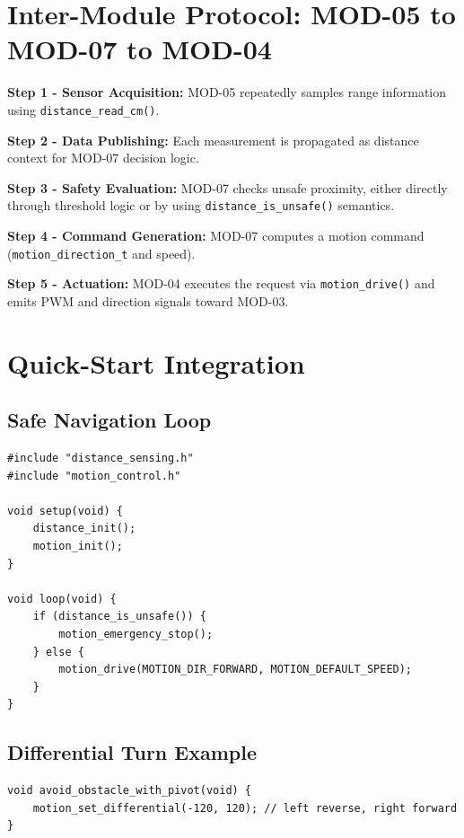 \documentclass[a4paper,11pt]{article}
\begin{document}
\section{Inter-Module Protocol: MOD-05 to MOD-07 to MOD-04}

\textbf{Step 1 - Sensor Acquisition:}
MOD-05 repeatedly samples range information using \texttt{distance\_read\_cm()}.

\textbf{Step 2 - Data Publishing:}
Each measurement is propagated as distance context for MOD-07 decision logic.

\textbf{Step 3 - Safety Evaluation:}
MOD-07 checks unsafe proximity, either directly through threshold logic or by
using \texttt{distance\_is\_unsafe()} semantics.

\textbf{Step 4 - Command Generation:}
MOD-07 computes a motion command (\texttt{motion\_direction\_t} and speed).

\textbf{Step 5 - Actuation:}
MOD-04 executes the request via \texttt{motion\_drive()} and emits PWM and
direction signals toward MOD-03.

\section{Quick-Start Integration}

\subsection{Safe Navigation Loop}

\begin{lstlisting}
#include "distance_sensing.h"
#include "motion_control.h"

void setup(void) {
    distance_init();
    motion_init();
}

void loop(void) {
    if (distance_is_unsafe()) {
        motion_emergency_stop();
    } else {
        motion_drive(MOTION_DIR_FORWARD, MOTION_DEFAULT_SPEED);
    }
}
\end{lstlisting}

\subsection{Differential Turn Example}

\begin{lstlisting}
void avoid_obstacle_with_pivot(void) {
    motion_set_differential(-120, 120); // left reverse, right forward
}
\end{lstlisting}
\end{document}
